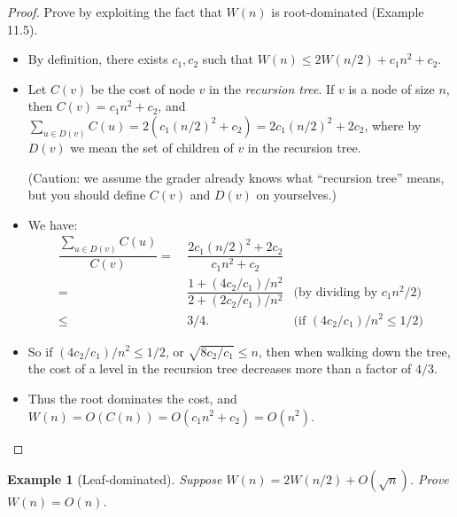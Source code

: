 \documentclass[11pt,a4paper,oneside,microtype,chapter,nokorean]{oblivoir}
\newtheorem{example}{Example}
\begin{document}
\begin{proof}
  Prove by exploiting the fact that $W(n)$ is root-dominated (Example 11.5).

  \begin{itemize}
  \item By definition, there exists $c_1,c_2$ such that $W(n) \le 2W(n/2) + c_1 n^2 + c_2.$
  \item Let $C(v)$ be the cost of node $v$ in the \emph{recursion tree}.  If $v$ is a node of size
    $n$, then $C(v) = c_1 n^2 + c_2$, and
    $\sum_{u \in D(v)} C(u) = 2(c_1 (n/2)^2 + c_2) = 2 c_1 (n/2)^2 + 2 c_2$, where by $D(v)$ we mean
    the set of children of $v$ in the recursion tree.

    (Caution: we assume the grader already knows what ``recursion tree'' means, but you should
    define $C(v)$ and $D(v)$ on yourselves.)
  \item We have:
    \begin{align*}
      \dfrac{\sum_{u \in D(v)} C(u)}{C(v)}
      = &~ \dfrac{2 c_1 (n/2)^2 + 2 c_2}{c_1 n^2 + c_2} \\
      = &~ \dfrac{1 + (4 c_2 / c_1) / n^2}{2 + (2 c_2 / c_1) / n^2} & \mbox{(by dividing by $c_1 n^2 / 2$)} \\
      \le &~ 3/4. & \mbox{(if $(4 c_2 / c_1) / n^2 \le 1/2$)}
    \end{align*}
  \item So if $(4 c_2 / c_1) / n^2 \le 1/2$, or $\sqrt{8 c_2 / c_1} \le n$, then when walking down
    the tree, the cost of a level in the recursion tree decreases more than a factor of $4/3$.
  \item Thus the root dominates the cost, and $W(n) = O(C(n)) = O(c_1 n^2 + c_2) = O(n^2)$.
  \end{itemize}
\end{proof}


\begin{example}[Leaf-dominated] Suppose $W(n) = 2W(n/2) + O(\sqrt{n})$.  Prove $W(n) = O(n)$.
\end{example}
\end{document}
